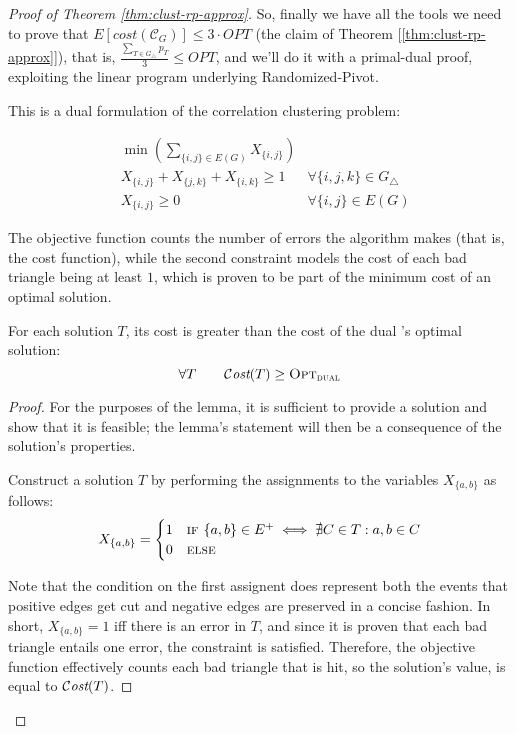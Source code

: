\begin{proof}[Proof of Theorem \ref{thm:clust-rp-approx}]
    So, finally we have all the tools we need to prove that $E\left[cost\left( \mathscr{C}_G \right)\right] \leq 3 \cdot OPT$ (the claim of Theorem [\ref{thm:clust-rp-approx}]), that is, $\frac{\sum_{T \in G_\triangle} p_T}{3} \leq OPT$, and we'll do it with a primal-dual proof, exploiting the linear program underlying Randomized-Pivot.
    
    This is a dual \lp{} formulation of the correlation clustering problem:
    
        \begin{align*} \label{lp:clust-dual}
            & \min \left( \sum_{\{i, j\} \in E(G)} X_{\{i, j\}} \right) & \\
            & X_{\{i, j\}} + X_{\{j, k\}} + X_{\{i, k\}} \geq 1         & \forall \{i, j, k\} \in G_\triangle \\
            & X_{\{i, j\}} \geq 0                                       & \forall \{i, j\} \in E(G)
        \end{align*}
    
    The objective function counts the number of errors the algorithm makes (that is, the cost function), while the second constraint models the cost of each bad triangle being at least $1$, which is proven to be part of the minimum cost of an optimal solution.
    
    \begin{lemma}\label{l:clust-3}
        For each solution $T$, its cost is greater than the cost of the dual \lp's optimal solution:
        \[
            \forall T \qquad \mathcal{C}\textit{ost}(T) \geq \textsc{Opt}_\textsc{dual}
        \]
    \end{lemma}

    \begin{proof}
        For the purposes of the lemma, it is sufficient to provide a solution and show that it is feasible; the lemma's statement will then be a consequence of the \lp{} solution's properties.
        
        Construct a solution $T$ by performing the assignments to the variables $X_{\{a, b\}}$ as follows:
        \[
            X_{\{a, b\}} = \begin{cases}
                1 & \textsc{if } \{a, b\} \in E^+ \iff \nexists C \in T : a, b \in C \\
                0 & \textsc{else}
            \end{cases}
        \]

        Note that the condition on the first assignent does represent both the events that positive edges get cut and negative edges are preserved in a concise fashion. In short, $X_{\{a, b\}} = 1$ iff there is an error in $T$, and since it is proven that each bad triangle entails one error, the constraint is satisfied. Therefore, the objective function effectively counts each bad triangle that is hit, so the solution's value, is equal to $\mathcal{C}\textit{ost}(T)$.
    \end{proof}
    

\end{proof}
